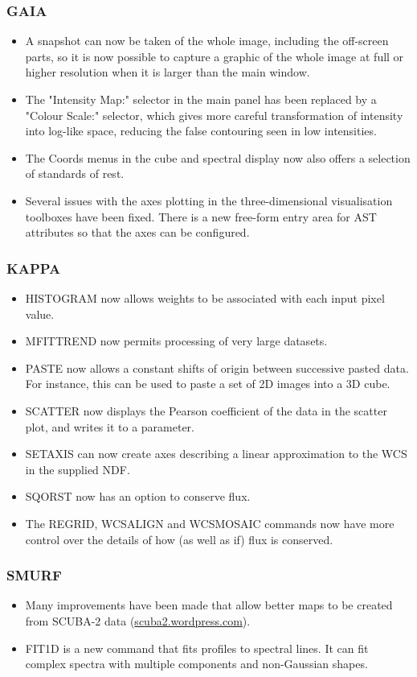 \subsubsection{GAIA}
\begin{itemize}
\item A snapshot can now be taken of the whole image, including the off-screen parts, so it is now possible to capture a graphic of the whole image at full or higher resolution when it is larger than the main window.
\item The "Intensity Map:" selector in the main panel has been replaced by a "Colour Scale:" selector, which gives more careful transformation of intensity into log-like space, reducing the false contouring seen in low intensities.
\item The Coords menus in the cube and spectral display now also offers a selection of standards of rest.
\item Several issues with the axes plotting in the three-dimensional visualisation toolboxes have been fixed. There is a new free-form entry area for AST attributes so that the axes can be configured.
\end{itemize}

\subsubsection{KAPPA}
\begin{itemize}
\item HISTOGRAM now allows weights to be associated with each input pixel value.
\item MFITTREND now permits processing of very large datasets.
\item PASTE now allows a constant shifts of origin between successive pasted data. For instance, this can be used to paste a set of 2D images into a 3D cube.
\item SCATTER now displays the Pearson coefficient of the data in the scatter plot, and writes it to a parameter.
\item SETAXIS can now create axes describing a linear approximation to the WCS in the supplied NDF.
\item SQORST now has an option to conserve flux.
\item The REGRID, WCSALIGN and WCSMOSAIC commands now have more control over the details of how (as well as if) flux is conserved.
\end{itemize}

\subsubsection{SMURF}
\begin{itemize}
\item Many improvements have been made that allow better maps to be
created from SCUBA-2 data (\url{scuba2.wordpress.com}).
\item FIT1D is a new command that fits profiles to spectral lines.  It can fit complex spectra with multiple components and non-Gaussian shapes.
\end{itemize}


